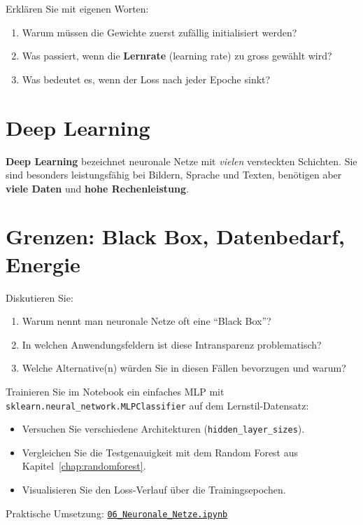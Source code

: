 \begin{myexercise}
Erklären Sie mit eigenen Worten:
\begin{enumerate}
    \item Warum müssen die Gewichte zuerst zufällig initialisiert werden?
    \item Was passiert, wenn die \textbf{Lernrate} (learning rate) zu gross gewählt wird?
    \item Was bedeutet es, wenn der Loss nach jeder Epoche sinkt?
\end{enumerate}
\end{myexercise}

\section{Deep Learning}

\begin{myremark}
\textbf{Deep Learning} bezeichnet neuronale Netze mit \emph{vielen} versteckten Schichten.
Sie sind besonders leistungsfähig bei Bildern, Sprache und Texten,
benötigen aber \textbf{viele Daten} und \textbf{hohe Rechenleistung}.
\end{myremark}

\section{Grenzen: Black Box, Datenbedarf, Energie}

\begin{myexercise}
Diskutieren Sie:
\begin{enumerate}
    \item Warum nennt man neuronale Netze oft eine \enquote{Black Box}?
    \item In welchen Anwendungsfeldern ist diese Intransparenz problematisch?
    \item Welche Alternative(n) würden Sie in diesen Fällen bevorzugen und warum?
\end{enumerate}
\end{myexercise}

\begin{mychallenge}
Trainieren Sie im Notebook ein einfaches MLP mit \texttt{sklearn.neural\_network.MLPClassifier}
auf dem Lernstil-Datensatz:
\begin{itemize}
    \item Versuchen Sie verschiedene Architekturen (\texttt{hidden\_layer\_sizes}).
    \item Vergleichen Sie die Testgenauigkeit mit dem Random Forest aus Kapitel~\cref{chap:randomforest}.
    \item Visualisieren Sie den Loss-Verlauf über die Trainingsepochen.
\end{itemize}
\end{mychallenge}

\begin{myremark}[Notebook]
Praktische Umsetzung:
\href{\notebookbaseurl06_Neuronale_Netze.ipynb}{\texttt{06\_Neuronale\_Netze.ipynb}}
\end{myremark}

